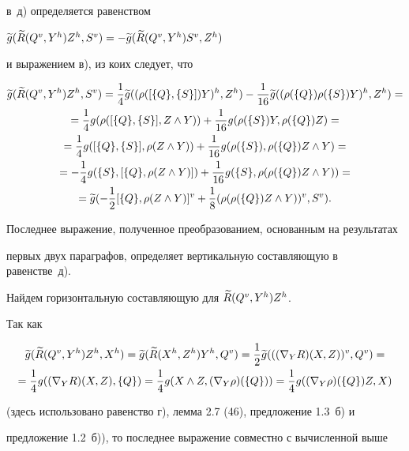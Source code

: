 \begin{pf}
в~д) определяется равенством


$\g{g}(\g{R}(\gv{Q},\gh{Y})\gh{Z},\gv{S})=


-\g{g}(\g{R}(\gv{Q},\gh{Y})\gv{S},\gh{Z})$


и выражением в), из коих следует, что


\begin{multline*}


\g{g}(\g{R}(\gv{Q},\gh{Y})\gh{Z},\gv{S})=


\4\g{g}(\gh{(\rho([\{Q\},\{S\}])Y)},\gh{Z})-\6\g{g}


(\gh{(\rho(\{Q\})\rho(\{S\})Y)},\gh{Z})=\\


=\4 g(\rho([\{Q\},\{S\}],Z\land Y))+\6 g(\rho(\{S\})Y,\rho(\{Q\})Z)=\\


=\4 g([\{Q\},\{S\}],\rho(Z\land Y))+\6 g(\rho(\{S\}),\rho(\{Q\})Z\land Y)=\\


=-\4 g(\{S\},[\{Q\},\rho(Z\land Y)])+\6 g(\{S\},\rho(\rho(\{Q\})Z\land Y))=\\


=\g{g}(-\1\gv{[\{Q\},\rho (Z\land Y)]}+\8\gv{(\rho(\rho(\{Q\})Z\land Y))},


\gv{S}).


\end{multline*}


Последнее выражение, полученное преобразованием, основанным на результатах


первых двух параграфов, определяет вертикальную составляющую в равенстве~д).


Найдем горизонтальную составляющую для $\widetilde {R}({Q}{}^v,{Y}{}^h){Z}{}^h$.


Так как


\begin{multline*}


\g{g}(\g{R}(\gv{Q},\gh{Y})\gh{Z},\gh{X})=\g{g}(\g{R}(\gh{X},\gh{Z})


\gh{Y},\gv{Q})=\1\g{g}(\gv{((\n{Y}{R})(X,Z))},\gv{Q})=\\


=\4 g((\n{Y}{R})(X,Z),\{Q\})=\4 g(X\land Z,(\n{Y}{\rho})(\{Q\}))=


\4 g((\n{Y}{\rho})(\{Q\})Z,X)


\end{multline*}


(здесь использовано равенство г), лемма 2.7 (46), предложение 1.3~б) и


предложение 1.2~б)), то последнее выражение совместно с вычисленной выше



\end{pf}
